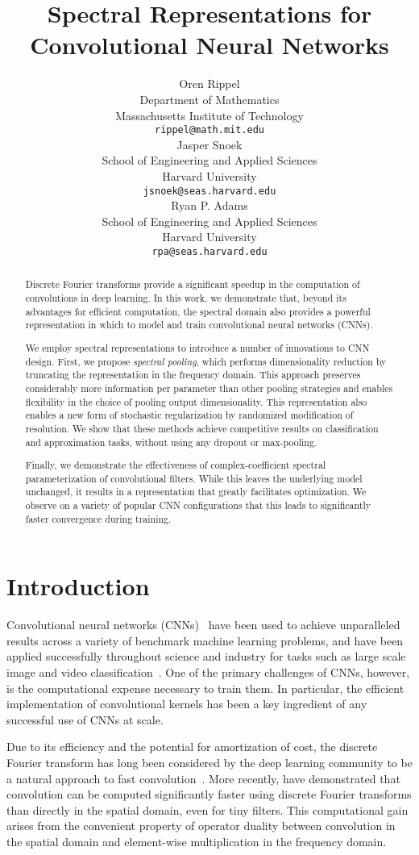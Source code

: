 \documentclass{article} \usepackage{nips15submit_e,times}
\title{Spectral Representations for \\Convolutional Neural Networks}
\author{
Oren Rippel \\
Department of Mathematics\\
Massachusetts Institute of Technology\\
\texttt{rippel@math.mit.edu} \\
\And
Jasper Snoek \\
School of Engineering and Applied Sciences \\
Harvard University \\
\texttt{jsnoek@seas.harvard.edu} \\
\AND
Ryan P. Adams \\
School of Engineering and Applied Sciences \\
Harvard University \\
\texttt{rpa@seas.harvard.edu} \\
}
\begin{document}
\maketitle
\begin{abstract}
Discrete Fourier transforms provide a significant speedup in the computation of convolutions in deep learning. In this work, we demonstrate that, beyond its advantages for efficient computation, the spectral domain also provides a powerful representation in which to model and train convolutional neural networks (CNNs).

We employ spectral representations to introduce a number of innovations to CNN design. First, we propose \emph{spectral pooling}, which performs dimensionality reduction by truncating the representation in the frequency domain. This approach preserves considerably more information per parameter than other pooling strategies and enables flexibility in the choice of pooling output dimensionality.  This representation also enables a new form of stochastic regularization by randomized modification of resolution.  We show that these methods achieve competitive results on classification and approximation tasks, without using any dropout or max-pooling.  

Finally, we demonstrate the effectiveness of complex-coefficient spectral parameterization of convolutional filters. While this leaves the underlying model unchanged, it results in a representation that greatly facilitates optimization. We observe on a variety of popular CNN configurations that this leads to significantly faster convergence during training.
\end{abstract}
\section{Introduction}
Convolutional neural networks (CNNs)~\citep{lecun-et-al-1990a} have been used to achieve unparalleled results across a variety of benchmark machine learning problems, and have been applied successfully throughout science and industry for tasks such as large scale image and video classification~\citep{krizhevsky-et-al-2012,karpathy-etal-2014}.  One of the primary challenges of CNNs, however, is the computational expense necessary to train them.  In particular, the efficient implementation of convolutional kernels has been a key ingredient of any successful use of CNNs at scale.

Due to its efficiency and the potential for amortization of cost, the discrete Fourier transform has long been considered by the deep learning community to be a natural approach to fast convolution~\citep{Bengio+chapter2007}. More recently, \citet{DBLP:journals/corr/MathieuHL13,DBLP:journals/corr/VasilacheJMCPL14} have demonstrated that convolution can be computed significantly faster using discrete Fourier transforms than directly in the spatial domain, even for tiny filters. This computational gain arises from the convenient property of operator duality between convolution in the spatial domain and element-wise multiplication in the frequency domain.
\end{document}
